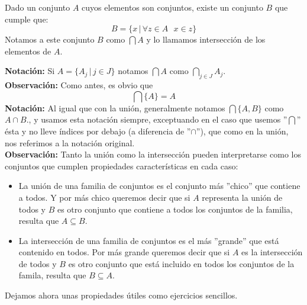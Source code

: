 \documentclass[12pt,a4paper]{book}
\begin{document}
\begin{prop} %
Dado un conjunto $A$ cuyos elementos son conjuntos, existe un conjunto $B$ que cumple que:
$$ B = \lbrace x \,\vert\, \forall z \in A \mbox{ } x \in z \rbrace $$
Notamos a este conjunto $B$ como $\bigcap A$ y lo llamamos intersección de los elementos de $A$.
\end{prop}

\textbf{Notación:} Si $A = \lbrace A_{j} \,\vert\, j \in J \rbrace$ notamos $\bigcap A$ como $\bigcap_{j\in J} A_{j}$.\\[0.5cm]
\textbf{Observación:} Como antes, es obvio que
$$\bigcap \lbrace A \rbrace = A$$
\textbf{Notación:} Al igual que con la unión, generalmente notamos $ \bigcap \lbrace A,B \rbrace$ como $A \cap B.$, y usamos esta notación siempre, exceptuando en el caso que usemos ''$\bigcap$'' ésta y no lleve índices por debajo (a diferencia de ''$\cap$''), que como en la unión, nos referimos a la notación original.\\[0.5 cm]
\textbf{Observación:} Tanto la unión como la intersección pueden interpretarse como los conjuntos que cumplen propiedades características en cada caso:
\begin{itemize}
\item La unión de una familia de conjuntos es el conjunto más ''chico'' que contiene a todos. Y por más chico queremos decir que si $A$ representa la unión de todos y $B$ es otro conjunto que contiene a todos los conjuntos de la familia, resulta que $A \subseteq B$.
\item La intersección de una familia de conjuntos es el más ''grande'' que está contenido en todos. Por más grande queremos decir que si $A$ es la intersección de todos y $B$ es otro conjunto que está incluido en todos los conjuntos de la famila, resulta que $B \subseteq A$.
\end{itemize}

Dejamos ahora unas propiedades útiles como ejercicios sencillos.\newpage
\end{document}
